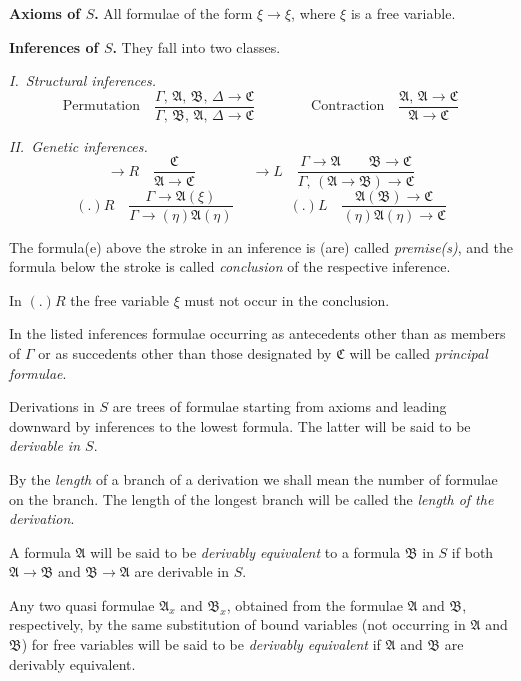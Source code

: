 \documentclass[12pt,a4paper]{article}
\begin{document}
\medskip
\noindent\textbf{Axioms of $S$.}\quad
All formulae of the form $\xi \to \xi$, where $\xi$ is a free variable.

\medskip
\noindent\textbf{Inferences of $S$.}\quad
They fall into two classes.

\smallskip
\noindent\textit{I.\ Structural inferences.}
\[
\text{Permutation}\quad
\dfrac{\Gamma,\,\mathfrak{A},\,\mathfrak{B},\,\Delta \to \mathfrak{C}}
     {\Gamma,\,\mathfrak{B},\,\mathfrak{A},\,\Delta \to \mathfrak{C}}
\qquad\qquad
\text{Contraction}\quad
\dfrac{\mathfrak{A},\,\mathfrak{A} \to \mathfrak{C}}
      {\mathfrak{A} \to \mathfrak{C}}
\]

\noindent\textit{II.\ Genetic inferences.}
\[
{\to}R\quad
\dfrac{\mathfrak{C}}{\mathfrak{A} \to \mathfrak{C}}
\qquad\qquad
{\to}L\quad
\dfrac{\Gamma \to \mathfrak{A}\qquad\mathfrak{B} \to \mathfrak{C}}
      {\Gamma,\,(\mathfrak{A} \to \mathfrak{B}) \to \mathfrak{C}}
\]
\[
{(.)R}\quad
\dfrac{\Gamma \to \mathfrak{A}(\xi)}{\Gamma \to (\eta)\mathfrak{A}(\eta)}
\qquad\qquad
{(.)L}\quad
\dfrac{\mathfrak{A}(\mathfrak{B}) \to \mathfrak{C}}
      {(\eta)\mathfrak{A}(\eta) \to \mathfrak{C}}
\]

The formula(e) above the stroke in an inference is (are) called
\emph{premise(s)}, and the formula below the stroke is called
\emph{conclusion} of the respective inference.

In $(.)R$ the free variable $\xi$ must not occur in the conclusion.

In the listed inferences formulae occurring as antecedents other than as
members of $\Gamma$ or as succedents other than those designated by
$\mathfrak{C}$ will be called \emph{principal formulae}.

Derivations in $S$ are trees of formulae starting from axioms and leading
downward by inferences to the lowest formula. The latter will be said to be
\emph{derivable in $S$}.

By the \emph{length} of a branch of a derivation we shall mean the number of
formulae on the branch. The length of the longest branch will be called the
\emph{length of the derivation}.

\medskip
A formula $\mathfrak{A}$ will be said to be \emph{derivably equivalent} to a
formula $\mathfrak{B}$ in $S$ if both $\mathfrak{A} \to \mathfrak{B}$ and
$\mathfrak{B} \to \mathfrak{A}$ are derivable in $S$.

Any two quasi formulae $\mathfrak{A}_x$ and $\mathfrak{B}_x$, obtained from
the formulae $\mathfrak{A}$ and $\mathfrak{B}$, respectively, by the same
substitution of bound variables (not occurring in $\mathfrak{A}$ and
$\mathfrak{B}$) for free variables will be said to be \emph{derivably
equivalent} if $\mathfrak{A}$ and $\mathfrak{B}$ are derivably equivalent.
\end{document}

